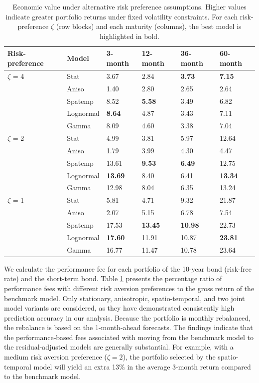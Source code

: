 \documentclass[
  12pt]{article}
\begin{document}
\begin{table}[t!]
    \centering
    \small %
    \setlength{\tabcolsep}{2pt} 
    \caption{Economic value under alternative risk preference assumptions. Higher values indicate greater portfolio returns under fixed volatility constraints. For each risk-preference $\zeta$ (row blocks) and each maturity (columns), the best model is highlighted in bold.}
    \begin{tabular}{l | l l  l  l  l}
    \hline
        Risk-preference & Model & 3-month & 12-month & 36-month & 60-month \\ \hline
        $\zeta$ = 4 & Stat & 3.67 & 2.84 & \textbf{3.73} & \textbf{7.15} \\ 
        & Aniso & 1.40 & 2.80 & 2.65 & 2.64 \\
        & Spatemp & 8.52 & \textbf{5.58} & 3.49 & 6.82 \\ 
        & Lognormal & \textbf{8.64} & 4.87 & 3.43 & 7.11 \\
        & Gamma & 8.09 & 4.60 & 3.38 & 7.04 \\  \hline
        $\zeta$ = 2 & Stat & 4.99 & 3.81 & 5.97 & 12.64  \\
        & Aniso & 1.79 & 3.99 & 4.30 & 4.47 \\
        & Spatemp & 13.61 & \textbf{9.53} & \textbf{6.49} & 12.75 \\
        & Lognormal & \textbf{13.69} & 8.40 & 6.41 & \textbf{13.34} \\
        & Gamma & 12.98 & 8.04 & 6.35 & 13.24 \\ \hline
        $\zeta$ = 1 & Stat & 5.81 & 4.71 & 9.32 & 21.87 \\
        & Aniso & 2.07 & 5.15 & 6.78 & 7.54 \\
        & Spatemp & 17.53 & \textbf{13.45} & \textbf{10.98} & 22.73 \\
        & Lognormal & \textbf{17.60} & 11.91 & 10.87 & \textbf{23.81} \\ 
        & Gamma & 16.77 & 11.47 & 10.78 & 23.64 \\
    \end{tabular}
    \label{fee}
\end{table}

We calculate the performance fee for each portfolio of the 10-year bond (risk-free rate) and the short-term bond. Table \ref{fee} presents the percentage ratio of performance fees with different risk aversion preferences to the gross return of the benchmark model. Only stationary, anisotropic, spatio-temporal, and two joint model variants are considered, as they have demonstrated consistently high prediction accuracy in our analysis. Because the portfolio is monthly rebalanced, the rebalance is based on the 1-month-ahead forecasts. The findings indicate that the performance‐based fees associated with moving from the benchmark model to the residual-adjusted models are generally substantial. For example, with a medium risk aversion preference ($\zeta = 2$), the portfolio selected by the spatio-temporal model will yield an extra 13\% in the average 3-month return compared to the benchmark model.
\end{document}
